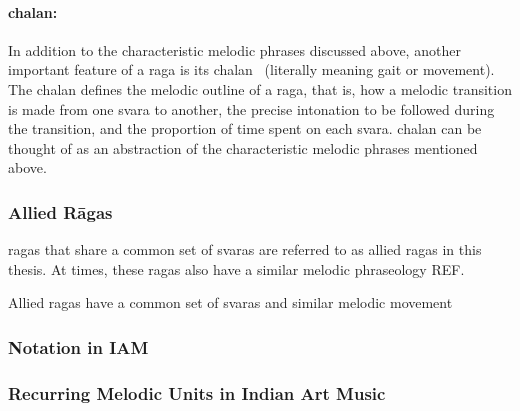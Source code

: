 
\paragraph{\Gls{chalan}:} In addition to the characteristic melodic phrases discussed above, another important feature of a \gls{raga} is its \gls{chalan}~\citep{rao1999raga} (literally meaning gait or movement). The \gls{chalan} defines the melodic outline of a \gls{raga}, that is, how a melodic transition is made from one \gls{svara} to another, the precise intonation to be followed during the transition, and the proportion of time spent on each \gls{svara}. \Gls{chalan} can be thought of as an abstraction of the characteristic melodic phrases mentioned above.

\subsubsection{Allied R\={a}gas}
\label{sec:allied_ragas}

\Glspl{raga} that share a common set of \glspl{svara} are referred to as allied \glspl{raga} in this thesis. At times, these \glspl{raga} also have a similar melodic phraseology REF. 

{Allied \glspl{raga} have a common set of svaras and similar melodic movement}~\cite{krishna2012carnatic}

\subsubsection{Notation in IAM}
\label{sec:notation_in_iam}



\subsubsection{Recurring Melodic Units in Indian Art Music}
\label{sec:recurring_melodic_patterns_iam}

